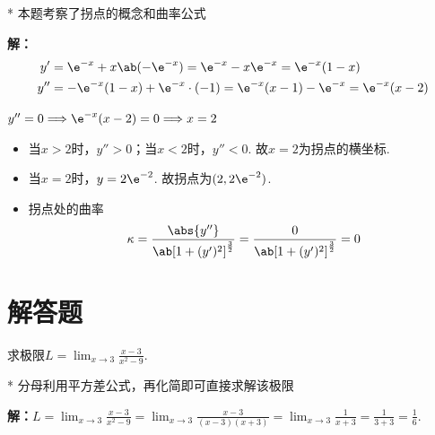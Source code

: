 \begin{solution}*
    本题考察了拐点的概念和曲率公式
    
    \textbf{解：}
    \[
    \begin{aligned}
        y'&=\e^{-x}+x\ab(-\e^{-x} )=\e^{-x}-x\e^{-x}=\e^{-x}(1-x)\\
        y''&=-\e^{-x}(1-x) +\e^{-x}\cdot(-1)=\e^{-x}(x-1)-\e^{-x}=\e^{-x}(x-2)\\
    \end{aligned}    
    \]

    $y''=0\Longrightarrow \e^{-x}(x-2) =0\Longrightarrow x=2$
\begin{itemize}
    \item 当$x>2$时，$y''>0$；当$x<2$时，$y''<0$. 故$x=2$为拐点的横坐标.
    \item 当$x=2$时，$y=2\e^{-2}$. 故拐点为$( 2,2\e^{-2})$.
    \item 拐点处的曲率
    \[\kappa =\frac{\abs{y''}}{\ab[1+(y') ^2 ] ^{\frac{3}{2}}}=\frac{0}{\ab[1+(y') ^2 ] ^{\frac{3}{2}}}=0\]
\end{itemize}
\end{solution}

\section{解答题}
\begin{problem}
    求极限$L=\lim_{x\to 3} \frac{x-3}{x^2-9}$. 
\end{problem}
\begin{draft}
    \vspace{5em}
\end{draft}
\begin{solution}*
    分母利用平方差公式，再化简即可直接求解该极限

    \textbf{解：}$L=\lim_{x\to 3} \frac{x-3}{x^2-9}=\lim_{x\to 3} \frac{x-3}{(x-3)(x+3)}=\lim_{x\to 3} \frac{1}{x+3}=\frac{1}{3+3}=\frac{1}{6}$.
\end{solution}



